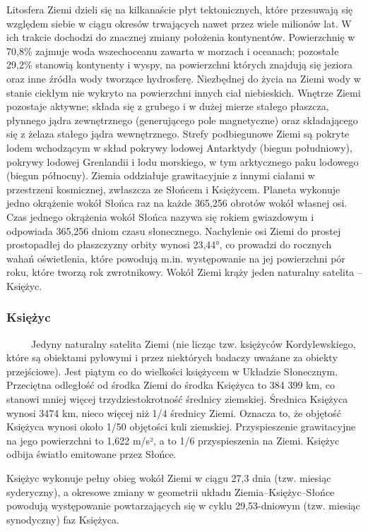 \documentclass[12pt, letterpaper, titlepage]{article}
\begin{document}
 \newline Litosfera Ziemi dzieli się na kilkanaście płyt tektonicznych, które przesuwają się względem siebie w ciągu okresów trwających nawet przez wiele milionów lat. W ich trakcie dochodzi do znacznej zmiany położenia kontynentów. Powierzchnię w 70,8\% zajmuje woda wszechoceanu zawarta w morzach i oceanach; pozostałe 29,2\% stanowią kontynenty i wyspy, na powierzchni których znajdują się jeziora oraz inne źródła wody tworzące hydrosferę. Niezbędnej do życia na Ziemi wody w stanie ciekłym nie wykryto na powierzchni innych ciał niebieskich. Wnętrze Ziemi pozostaje aktywne; składa się z grubego i w dużej mierze stałego płaszcza, płynnego jądra zewnętrznego (generującego pole magnetyczne) oraz składającego się z żelaza stałego jądra wewnętrznego. Strefy podbiegunowe Ziemi są pokryte lodem wchodzącym w skład pokrywy lodowej Antarktydy (biegun południowy), pokrywy lodowej Grenlandii i lodu morskiego, w tym arktycznego paku lodowego (biegun północny). Ziemia oddziałuje grawitacyjnie z innymi ciałami w przestrzeni kosmicznej, zwłaszcza ze Słońcem i Księżycem. Planeta wykonuje jedno okrążenie wokół Słońca raz na każde 365,256 obrotów wokół własnej osi. Czas jednego okrążenia wokół Słońca nazywa się rokiem gwiazdowym i odpowiada 365,256 dniom czasu słonecznego. Nachylenie osi Ziemi do prostej prostopadłej do płaszczyzny orbity wynosi 23,44°, co prowadzi do rocznych wahań oświetlenia, które powodują m.in. występowanie na jej powierzchni pór roku, które tworzą rok zwrotnikowy. Wokół Ziemi krąży jeden naturalny satelita – Księżyc. 
\subsubsection{Księżyc}
\ \ \ \ \ Jedyny naturalny satelita Ziemi (nie licząc tzw. księżyców Kordylewskiego, które są obiektami pyłowymi i przez niektórych badaczy uważane za obiekty przejściowe). Jest piątym co do wielkości księżycem w Układzie Słonecznym. Przeciętna odległość od środka Ziemi do środka Księżyca to 384 399 km, co stanowi mniej więcej trzydziestokrotność średnicy ziemskiej. Średnica Księżyca wynosi 3474 km, nieco więcej niż 1/4 średnicy Ziemi. Oznacza to, że objętość Księżyca wynosi około 1/50 objętości kuli ziemskiej. Przyspieszenie grawitacyjne na jego powierzchni to 1,622 m/s², a to 1/6 przyspieszenia na Ziemi.
\newline
\newline
Księżyc odbija światło emitowane przez Słońce.

Księżyc wykonuje pełny obieg wokół Ziemi w ciągu 27,3 dnia (tzw. miesiąc syderyczny), a okresowe zmiany w geometrii układu Ziemia–Księżyc–Słońce powodują występowanie powtarzających się w cyklu 29,53-dniowym (tzw. miesiąc synodyczny) faz Księżyca.
\end{document}
